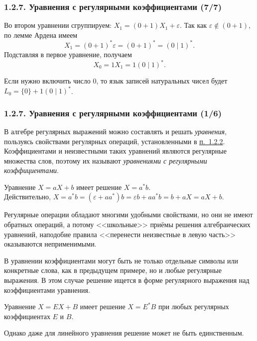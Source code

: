 \documentclass[mathserif,12pt,aspectratio=169]{beamer}
\def\emразделенной{\em разделенной}
\renewcommand{\index}[1]{}
\def\em#1{\it\color{blue}#1}
\def\odmkey#1#2{{\it\color{red} #1}\index{#2}}
\def\DMref#1#2{{\color{blue}\underline{\hyperlink{#2}{#1}}}}
\begin{document}
\begin{frame}
\frametitle{1.2.7. Уравнения с регулярными коэффициентами (7/7)}

Во втором уравнении сгруппируем:
$X_1=(0+1)X_1+\varepsilon$.
Так как $\varepsilon\notin (0+1)$, по лемме Ардена имеем
\[
X_1=(0+1)^*\varepsilon=(0+1)^*=(0\mid 1)^*.
\]
Подставляя в первое уравнение, получаем
\[
X_0=1X_1=1(0\mid 1)^*.
\]


\begin{remark}
Если нужно включить число $0$, то язык записей натуральных чисел будет
$L_0=\{0\}+1(0\mid 1)^*$.
\end{remark}

\end{frame}

\begin{frame}
\frametitle{1.2.7. Уравнения с регулярными коэффициентами (1/6)}
В алгебре регулярных выражений можно 
составлять и решать {\em уравнения}, пользуясь 
свойствами регулярных операций, установленными
в \DMref{п.~1.2.2}{1.2.2.}.
Коэффициентами и неизвестными таких
уравнений являются регулярные множества 
слов, поэтому их называют
\odmkey{уравнениями с  регулярными коэффициентами}{Уравнение!с регулярными коэффициентами}.

\begin{example}
Уравнение $X=aX+b$ имеет решение $X=a^*b$.\\
Действительно, $X=a^*b=(\varepsilon+aa^*)b
=\varepsilon b +aa^*b = b+aX=aX+b$.
\end{example}

\begin{digress}
Регулярные операции обладают многими 
удобными свойствами, но они не имеют
обратных операций, 
а потому <<школьные>> приёмы
решения алгебраических уравнений,
наподобие правила 
<<перенести неизвестные в левую часть>>
оказываются неприменимыми.
\end{digress}

В уравнении коэффициентами могут 
быть не только отдельные символы или конкретные слова,
как в предыдущем примере, 
но и любые регулярные выражения.
В этом случае решение ищется в форме
регулярного выражения над коэффициентами
уравнения.

\begin{example}
Уравнение $X=EX+B$ имеет решение $X=E^*B$
при любых регулярных коэффициентах $E$ и $B$.
\end{example} 

Однако даже для линейного уравнения решение
может не быть единственным.
\end{frame}
\end{document}
